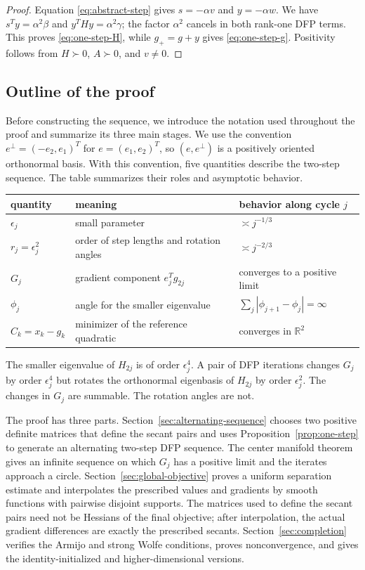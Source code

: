 \documentclass[11pt]{article}
\newcommand{\R}{\mathbb R}
\begin{document}
\begin{proof}
Equation \eqref{eq:abstract-step} gives $s=-\alpha v$ and
$y=-\alpha w$.  We have $s^Ty=\alpha^2\beta$ and
$y^THy=\alpha^2\gamma$; the factor $\alpha^2$ cancels in both rank-one DFP
terms.  This proves \eqref{eq:one-step-H}, while $g_+=g+y$ gives
\eqref{eq:one-step-g}.  Positivity follows from $H\succ0$, $A\succ0$, and
$v\ne0$.
\end{proof}

\subsection{Outline of the proof}

Before constructing the sequence, we introduce the notation used
throughout the proof and summarize its three main stages.  We use the
convention $e^\perp=(-e_2,e_1)^T$ for
$e=(e_1,e_2)^T$, so $(e,e^\perp)$ is a positively oriented orthonormal
basis.  With this convention, five quantities describe the two-step sequence.  The table summarizes their
roles and asymptotic behavior.
\begin{center}
\small
\begin{tabular}{@{}lll@{}}
\toprule
quantity & meaning & behavior along cycle $j$\\
\midrule
$\epsilon_j$ & small parameter & $\asymp j^{-1/3}$\\
$r_j=\epsilon_j^2$ & order of step lengths and rotation angles & $\asymp j^{-2/3}$\\
$G_j$ & gradient component $e_j^Tg_{2j}$ & converges to a positive limit\\
$\phi_j$ & angle for the smaller eigenvalue
  & $\sum_j|\phi_{j+1}-\phi_j|=\infty$\\
$C_k=x_k-g_k$ & minimizer of the reference quadratic & converges in $\R^2$\\
\bottomrule
\end{tabular}
\end{center}
The smaller eigenvalue of $H_{2j}$ is of order $\epsilon_j^4$.  A pair of DFP
iterations changes $G_j$ by order $\epsilon_j^4$ but rotates the orthonormal
eigenbasis of $H_{2j}$ by order $\epsilon_j^2$.  The changes in $G_j$ are
summable.  The rotation angles are not.

The proof has three parts.  Section~\ref{sec:alternating-sequence} chooses two
positive definite matrices that define the secant pairs and uses
Proposition~\ref{prop:one-step} to generate an alternating
two-step DFP sequence.  The center manifold theorem gives an infinite
sequence on which $G_j$ has a positive limit and the iterates approach a
circle.  Section~\ref{sec:global-objective} proves a uniform separation
estimate and interpolates the prescribed values and gradients by
smooth functions with pairwise disjoint supports.  The matrices used to define
the secant pairs need not be Hessians of the final objective; after
interpolation, the actual gradient differences are exactly the prescribed
secants.  Section~\ref{sec:completion} verifies the Armijo and strong Wolfe
conditions, proves nonconvergence, and gives the identity-initialized and
higher-dimensional versions.
\end{document}

